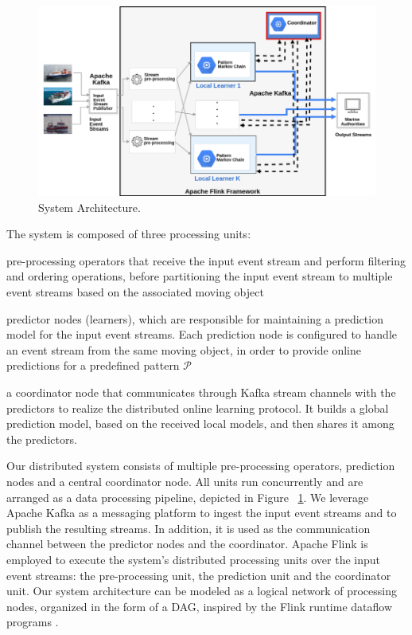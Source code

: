 \begin{figure}[h]

\includegraphics[width=\linewidth]{figures/distributed_architecture_2.png}
	
\caption{System Architecture.}
\label{fig:architecture}
\end{figure}

The system is composed of three processing units:   \begin{enumerate*}[(i)]
	\item pre-processing operators that receive the input event stream and perform filtering and ordering operations, before partitioning the input event stream to multiple event streams based on the associated moving object 
	\item predictor nodes (learners), which are responsible for maintaining a prediction model for the input event streams. Each prediction node is configured to handle an event stream from the same moving object, in order to provide online predictions for a predefined pattern $\mathcal{P}$  
	\item a coordinator node that communicates through Kafka stream channels with the predictors to realize the distributed online learning protocol. It builds a global prediction model, based on the received local models, and then shares it among the predictors.
\end{enumerate*}

\par Our distributed system consists of multiple pre-processing operators, prediction nodes and a central coordinator node. All units run concurrently and are arranged as a  data processing pipeline, depicted in Figure ~\ref{fig:architecture}. We leverage Apache Kafka as a messaging platform to ingest the input event streams and to publish the resulting streams. In addition, it is used as the communication channel between the predictor nodes and the coordinator. Apache Flink is employed to execute the system's distributed processing units over the input event streams: the pre-processing unit,  the prediction unit and the coordinator unit. Our system architecture can be modeled as a logical network of processing nodes, organized in the form of a DAG, inspired by the Flink runtime dataflow programs \cite{carbone2015apache}.  
